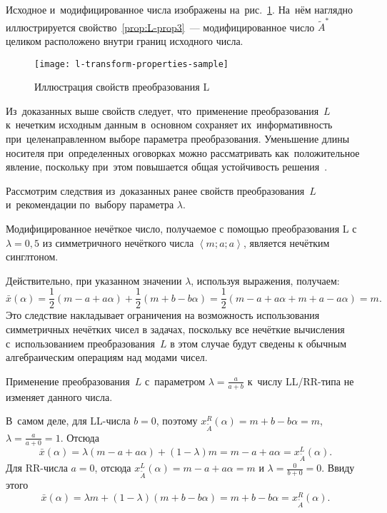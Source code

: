 Исходное и~модифицированное числа изображены на~рис.~\ref{fig:l-transform-properties-sample}. На~нём наглядно иллюстрируется свойство~\ref{prop:L-prop3}~--- модифицированное число $\tilde A^{*}$ целиком расположено внутри границ исходного числа.
\begin{figure}[h!]
  \centering
  {
    \texttt{[image: l-transform-properties-sample]}
    \caption{Иллюстрация свойств преобразования L}
    \label{fig:l-transform-properties-sample}
  }
\end{figure}

Из~доказанных выше свойств следует, что~применение преобразования~$L$ к~нечетким исходным данным в~основном сохраняет их~информативность при~целенаправленном выборе параметра преобразования. Уменьшение длины носителя при~определенных оговорках можно рассматривать как~положительное явление, поскольку при~этом повышается общая устойчивость решения~\cite{Vorontsov_PI}.

Рассмотрим следствия из~доказанных ранее свойств преобразования~$L$ и~рекомендации по~выбору параметра $\lambda$.
\begin{cor}
Модифицированное нечёткое число, получаемое с помощью преобразования L с~$\lambda =0,5$ из симметричного нечёткого числа $\left\langle m;a;a \right\rangle$, является нечётким синглтоном.
\end{cor}
Действительно, при указанном значении $\lambda $, используя выражения, получаем:
\begin{equation*}
  \bar{x}\left( \alpha  \right)=\frac{1}{2}\left( m-a+a\alpha  \right)+\frac{1}{2}\left( m+b-b\alpha  \right)=\frac{1}{2}\left( m-a+a\alpha +m+a-a\alpha  \right)=m.
\end{equation*}
Это следствие накладывает ограничения на возможность использования симметричных нечётких чисел в задачах, поскольку все нечёткие вычисления с~использованием преобразования~$L$ в этом случае будут сведены к обычным алгебраическим операциям над модами чисел.

\begin{cor}
Применение преобразования~$L$ с~параметром $\displaystyle \lambda =\frac{a}{a+b}$ к~числу LL/RR-типа не изменяет данного числа.
\end{cor}
В~самом деле, для LL-числа $b=0$, поэтому $x_{{\tilde{A}}}^{R}\left( \alpha  \right)=m+b-b\alpha=m$, $\lambda=\frac{a}{a+0}=1$. Отсюда
\begin{equation*}
  \bar{x}\left( \alpha  \right)=\lambda \left( m-a+a\alpha  \right)+\left( 1-\lambda  \right)m=m-a+a\alpha =x_{\tilde A}^{L}\left( \alpha  \right).
\end{equation*}
Для RR-числа $a=0$, отсюда $x_{\tilde A}^{L}\left( \alpha  \right)=m-a+a\alpha=m$ и $\lambda =\frac{0}{b+0}=0$. Ввиду этого
\begin{equation*}
  \bar{x}\left( \alpha  \right)=\lambda m+\left( 1-\lambda  \right)\left( m+b-b\alpha  \right)=m+b-b\alpha =x_{\tilde A}^{R}\left( \alpha  \right).
\end{equation*}

